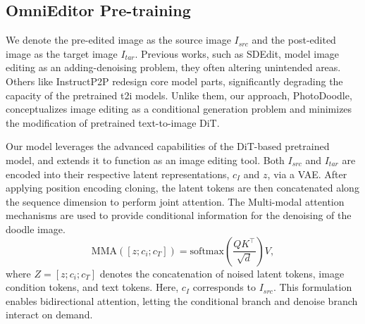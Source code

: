 


\subsection{OmniEditor Pre-training}
We denote the pre-edited image as the source image $I_{src}$ and the post-edited image as the target image $I_{tar}$. Previous works, such as SDEdit, model image editing as an adding-denoising problem, they often altering unintended areas. Others like InstructP2P\cite{brooks2023instructpix2pix} redesign core model parts, significantly degrading the capacity of the pretrained t2i models. Unlike them, our approach, PhotoDoodle, conceptualizes image editing as a conditional generation problem and minimizes the modification of pretrained text-to-image DiT. 

Our model leverages the advanced capabilities of the DiT-based pretrained model, and extends it to function as an image editing tool. Both $I_{src}$ and $I_{tar}$ are encoded into their respective latent representations, $c_I$ and $z$, via a VAE. After applying position encoding cloning, the latent tokens are then concatenated along the sequence dimension to perform joint attention. The Multi-modal attention mechanisms are used to provide conditional information for the denoising of the doodle image. 
\begin{equation}
\text{MMA}([z; c_{i}; c_T]) = \text{softmax}\left(\frac{QK^\top}{\sqrt{d}}\right)V,
\end{equation}
where $\textit{Z}=[z; c_{i}; c_T]$ denotes the concatenation of noised latent tokens, image condition tokens, and text tokens. Here, $c_{I}$ corresponds to $I_{src}$. This formulation enables bidirectional attention, letting the conditional branch and denoise branch interact on demand.


